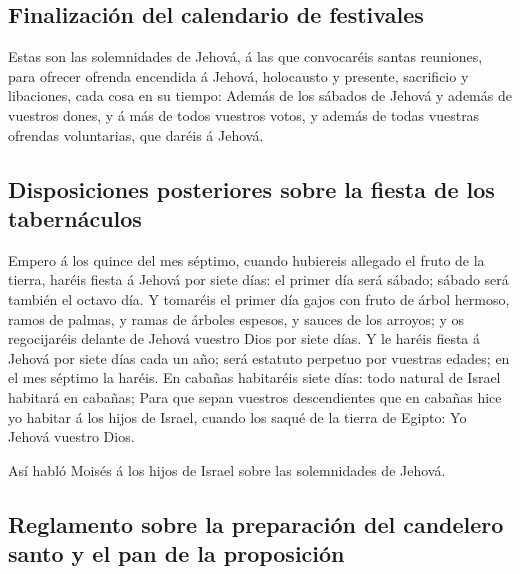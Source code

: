 \hypertarget{finalizaciuxf3n-del-calendario-de-festivales}{%
\subsection{Finalización del calendario de
festivales}\label{finalizaciuxf3n-del-calendario-de-festivales}}

 Estas son las solemnidades de Jehová, á las que
convocaréis santas reuniones, para ofrecer ofrenda encendida á Jehová,
holocausto y presente, sacrificio y libaciones, cada cosa en su tiempo:
 Además de los sábados de Jehová y además de vuestros
dones, y á más de todos vuestros votos, y además de todas vuestras
ofrendas voluntarias, que daréis á Jehová.

\hypertarget{disposiciones-posteriores-sobre-la-fiesta-de-los-tabernuxe1culos}{%
\subsection{Disposiciones posteriores sobre la fiesta de los
tabernáculos}\label{disposiciones-posteriores-sobre-la-fiesta-de-los-tabernuxe1culos}}

 Empero á los quince del mes séptimo, cuando hubiereis
allegado el fruto de la tierra, haréis fiesta á Jehová por siete días:
el primer día será sábado; sábado será también el octavo día.
 Y tomaréis el primer día gajos con fruto de árbol hermoso,
ramos de palmas, y ramas de árboles espesos, y sauces de los arroyos; y
os regocijaréis delante de Jehová vuestro Dios por siete días.
 Y le haréis fiesta á Jehová por siete días cada un año;
será estatuto perpetuo por vuestras edades; en el mes séptimo la haréis.
 En cabañas habitaréis siete días: todo natural de Israel
habitará en cabañas;  Para que sepan vuestros descendientes
que en cabañas hice yo habitar á los hijos de Israel, cuando los saqué
de la tierra de Egipto: Yo Jehová vuestro Dios.

 Así habló Moisés á los hijos de Israel sobre las
solemnidades de Jehová.

\hypertarget{reglamento-sobre-la-preparaciuxf3n-del-candelero-santo-y-el-pan-de-la-proposiciuxf3n}{%
\subsection{Reglamento sobre la preparación del candelero santo y el pan
de la
proposición}\label{reglamento-sobre-la-preparaciuxf3n-del-candelero-santo-y-el-pan-de-la-proposiciuxf3n}}


